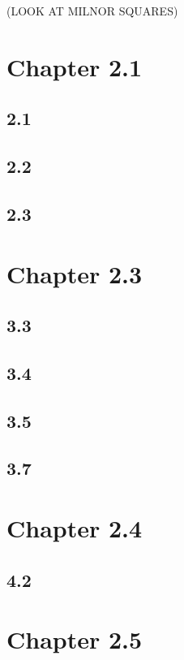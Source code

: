 \documentclass[12pt]{article}
\begin{document}
(LOOK AT MILNOR SQUARES)

\section{Chapter 2.1}

\subsection{2.1}

\subsection{2.2}

\subsection{2.3}

\section{Chapter 2.3}

\subsection{3.3}

\subsection{3.4}

\subsection{3.5}

\subsection{3.7}

\section{Chapter 2.4}

\subsection{4.2}

\section{Chapter 2.5}
\end{document}
